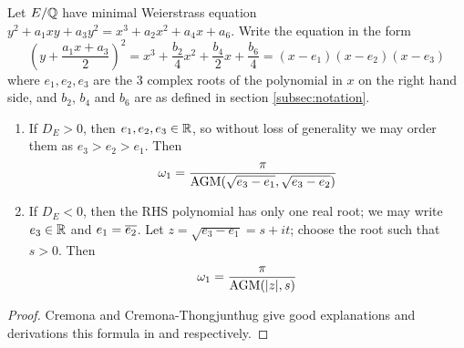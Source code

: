 \begin{proposition}\label{prop:real_period_by_AGM}
Let $E/\mathbb{Q}$ have minimal Weierstrass equation $y^2 + a_1 xy + a_3 y^2 = x^3 + a_2 x^2 + a_4 x + a_6$. Write the equation in the form
\begin{equation}\label{eqn:weierstrass_with_bn}
\left(y + \frac{a_1x + a_3}{2}\right)^2 = x^3 + \frac{b_2}{4} x^2 + \frac{b_4}{2} x + \frac{b_6}{4} = (x-e_1)(x-e_2)(x-e_3)
\end{equation}
where $e_1,e_2,e_3$ are the 3 complex roots of the polynomial in $x$ on the right hand side, and $b_2$, $b_4$ and $b_6$ are as defined in section \ref{subsec:notation}.
\begin{enumerate}
\item If $D_E > 0$, then $e_1,e_2,e_3 \in \mathbb{R}$, so without loss of generality we may order them as $e_3 > e_2 > e_1$. Then
\begin{equation}\label{eqn:omega_D_pos}
\omega_1 = \frac{\pi}{\text{AGM}(\sqrt{e_3-e_1},\sqrt{e_3-e_2})}
\end{equation}
\item If $D_E < 0$, then the RHS polynomial has only one real root; we may write $e_3 \in \mathbb{R}$ and $e_1 = \overline{e_2}$. Let $z = \sqrt{e_3-e_1} = s + it$; choose the root such that $s>0$. Then
\begin{equation}\label{eqn:omega_D_neg}
\omega_1 = \frac{\pi}{\text{AGM}(|z|,s)}
\end{equation}
\end{enumerate}
\end{proposition}
\begin{proof}
Cremona and Cremona-Thongjunthug give good explanations and derivations this formula in \cite{Cre-1997} and \cite{Cre-2013} respectively.
\end{proof}

